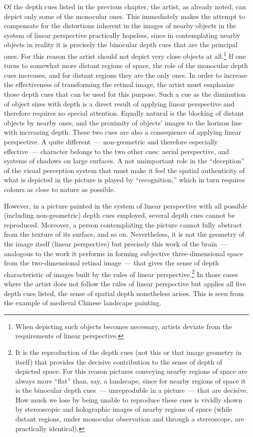 Of the depth cues listed in the previous chapter, the artist, as already noted, can depict
only some of the monocular ones.  This immediately makes the attempt to compensate
for the distortions inherent in the images of nearby objects in the system of linear
perspective practically hopeless, since in contemplating nearby objects in reality it is
precisely the binocular depth cues that are the principal ones.  For this reason the artist
should not depict very close objects at all.\footnote{%
  When depicting such objects becomes necessary, artists deviate from the requirements
  of linear perspective.}
  If one turns to somewhat more distant regions of space, the role of the monocular
depth cues increases, and for distant regions they are the only ones.  In order to
increase the effectiveness of transforming the retinal image, the artist must emphasize
those depth cues that can be used for this purpose.  Such a cue as the diminution of
object sizes with depth is a direct result of applying linear perspective and therefore
requires no special attention.  Equally natural is the blocking of distant objects by
nearby ones, and the proximity of objects' images to the horizon line with increasing
depth.  These two cues are also a consequence of applying linear perspective.  A quite
different~--- non-geometric and therefore especially effective~--- character belongs to
the two other cues: aerial perspective, and systems of shadows on large surfaces.  A
not unimportant role in the ``deception'' of the visual perception system that must make
it feel the spatial authenticity of what is depicted in the picture is played by
``recognition,'' which in turn requires colours as close to nature as possible.


However, in a picture painted in the system of linear perspective with all possible
(including non-geometric) depth cues employed, several depth cues cannot be
reproduced.  Moreover, a person contemplating the picture cannot fully abstract from
the texture of its surface, and so on.  Nevertheless, it is not the geometry of the image
itself (linear perspective) but precisely this work of the brain~--- analogous to the work
it performs in forming subjective three-dimensional space from the two-dimensional
retinal image~--- that gives the sense of depth characteristic of images built by the rules
of linear perspective.\footnote{%
  It is the reproduction of the depth cues (not this or that image geometry in itself)
  that provides the decisive contribution to the sense of depth of depicted space.  For
  this reason pictures conveying nearby regions of space are always more ``flat'' than,
  say, a landscape, since for nearby regions of space it is the binocular depth cues~---
  unreproduble in a picture~--- that are decisive.  How much we lose by being unable to
  reproduce these cues is vividly shown by stereoscopic and holographic images of
  nearby regions of space (while distant regions, under monocular observation and
  through a stereoscope, are practically identical).}
  In those cases where the artist does not follow the rules of linear perspective but
applies all five depth cues listed, the sense of spatial depth nonetheless arises.  This
is seen from the example of medieval Chinese landscape painting.

